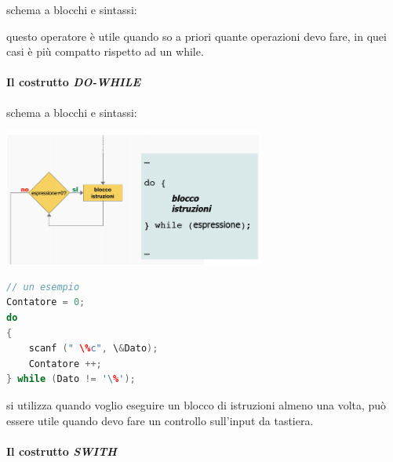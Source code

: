 \documentclass[
  paper=a4,
  oneside  ,captions=tableheading
]{scrbook}
\begin{document}
schema a blocchi e sintassi:

questo operatore è utile quando so a priori quante operazioni devo fare,
in quei casi è più compatto rispetto ad un while.

\hypertarget{il-costrutto-do-while}{%
\paragraph{\texorpdfstring{Il costrutto
\emph{DO-WHILE}}{Il costrutto DO-WHILE}}\label{il-costrutto-do-while}}

schema a blocchi e sintassi:
\begin{center}
\includegraphics[height=4.5cm]{./image/image-20201207224157049.png}
\end{center}
\begin{lstlisting}[language={C++}]
// un esempio
Contatore = 0;
do
{
    scanf (" \%c", \&Dato);
    Contatore ++;
} while (Dato != '\%');
\end{lstlisting}

si utilizza quando voglio eseguire un blocco di istruzioni almeno una
volta, può essere utile quando devo fare un controllo sull'input da
tastiera.

\hypertarget{il-costrutto-swith}{%
\paragraph{\texorpdfstring{Il costrutto
\emph{SWITH}}{Il costrutto SWITH}}\label{il-costrutto-swith}}
\end{document}
